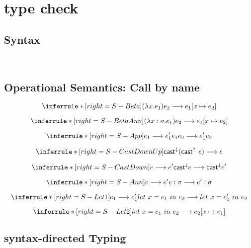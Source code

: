 \section{type check}

\subsection{Syntax}
\gram{
      \otte\ottinterrule
      \ottR\ottinterrule
      \ottt\ottinterrule
  }
\\[2.0mm]

\subsection{Operational Semantics: Call by name}

\[
\inferrule*[right=S-Beta]
{  }
{ (\lambda x. e_1) e_2 \longrightarrow e_1 [x\mapsto e_2] }
\]

\[
\inferrule*[right=S-BetaAnn]
{  }
{ (\lambda x:\sigma. e_1) e_2 \longrightarrow e_1 [x\mapsto e_2] }
\]

\[
\inferrule*[right=S-App]
{ e_1 \longrightarrow e_1'  }
{ e_1 e_2 \longrightarrow e_1' e_2}
\]

\[
\inferrule*[right=S-CastDownUp]
{  }
{ \mathsf{cast}^\downarrow(\mathsf{cast}^\uparrow\ e)  \longrightarrow e }
\]

\[
\inferrule*[right=S-CastDown]
{ e \longrightarrow e' }
{ \mathsf{cast}^\downarrow e  \longrightarrow  \mathsf{cast}^\downarrow e' }
\]

\[
\inferrule*[right=S-Ann]
{ e \longrightarrow e'  }
{ e:\sigma \longrightarrow e':\sigma}
\]

\[
\inferrule*[right=S-Let1]
{ e_1 \longrightarrow e_1'  }
{ let\ x = e_1\ in\ e_2 \longrightarrow let\ x = e_1'\ in\ e_2 }
\]

\[
\inferrule*[right=S-Let2]
{  }
{ let\ x = e_1\ in\ e_2 \longrightarrow e_2[x\mapsto e_1] }
\]

\subsection{syntax-directed Typing}

\newcommand{\checktype}{\Gamma\vdash_\Downarrow}
\newcommand{\infertype}{\Gamma\vdash_\Uparrow}
\newcommand{\infercheck}{\Gamma\vdash_\delta}

\newcommand{\checktypeno}{\vdash_\Downarrow}
\newcommand{\infertypeno}{\vdash_\Uparrow}
\newcommand{\infercheckno}{\vdash_\delta}

